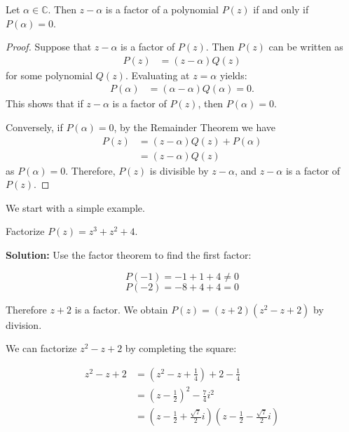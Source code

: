 \documentclass[
	12pt, %
	fleqn, %
	a4paper, %
]{LegrandOrangeBook}
\begin{document}
\begin{theorem}
    Let \(\alpha \in \mathbb{C}\). Then \(z - \alpha\) is a factor of a polynomial \(P(z)\) if and only if \(P(\alpha) = 0\).
\end{theorem}
\begin{proof}
    Suppose that \( z - \alpha \) is a factor of \( P(z) \). Then \( P(z) \) can be written as
    \begin{equation}
    \begin{aligned}
        P(z) &= (z - \alpha)Q(z)
    \end{aligned}
    \end{equation}
    for some polynomial \( Q(z) \). Evaluating at \( z = \alpha \) yields:
    \begin{equation}
    \begin{aligned}
        P(\alpha) &= (\alpha - \alpha)Q(\alpha) = 0.
    \end{aligned}
    \end{equation}
    This shows that if \( z - \alpha \) is a factor of \( P(z) \), then \( P(\alpha) = 0 \).
    
    Conversely, if \( P(\alpha) = 0 \), by the Remainder Theorem we have
    \begin{equation}
    \begin{aligned}
        P(z) &= (z - \alpha)Q(z) + P(\alpha) \\
             &= (z - \alpha)Q(z)
    \end{aligned}
    \end{equation}
    as \( P(\alpha) = 0 \). Therefore, \( P(z) \) is divisible by \( z - \alpha \), and \( z - \alpha \) is a factor of \( P(z) \).
    \end{proof}
We start with a simple example.
\begin{example}
    Factorize \( P(z) = z^3 + z^2 + 4 \).
\end{example}
\textbf{Solution:}
Use the factor theorem to find the first factor:

\[
P(-1) = -1 + 1 + 4 \neq 0
\]
\[
P(-2) = -8 + 4 + 4 = 0
\]

Therefore \( z + 2 \) is a factor. We obtain \( P(z) = (z + 2)(z^2 - z + 2) \) by division.

We can factorize \( z^2 - z + 2 \) by completing the square:

\begin{equation*}
\begin{aligned}
z^2 - z + 2 &= \left(z^2 - z + \frac{1}{4}\right) + 2 - \frac{1}{4} \\
            &= \left(z - \frac{1}{2}\right)^2 - \frac{7}{4}i^2 \\
            &= \left(z - \frac{1}{2} + \frac{\sqrt{7}}{2}i\right)\left(z - \frac{1}{2} - \frac{\sqrt{7}}{2}i\right)
\end{aligned}
\end{equation*}
\end{document}
